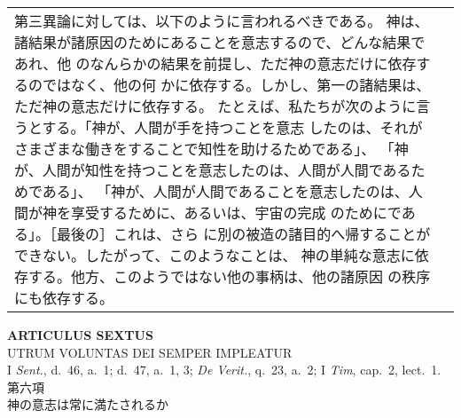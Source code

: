 \documentclass[10pt]{jsarticle} %
\begin{document}
\begin{longtable}{p{21em}p{21em}}
第三異論に対しては、以下のように言われるべきである。
神は、諸結果が諸原因のためにあることを意志するので、どんな結果であれ、他
 のなんらかの結果を前提し、ただ神の意志だけに依存するのではなく、他の何
 かに依存する。しかし、第一の諸結果は、ただ神の意志だけに依存する。
たとえば、私たちが次のように言うとする。「神が、人間が手を持つことを意志
 したのは、それがさまざまな働きをすることで知性を助けるためである」、
 「神が、人間が知性を持つことを意志したのは、人間が人間であるためである」、
 「神が、人間が人間であることを意志したのは、人間が神を享受するために、あるいは、宇宙の完成
 のためにである」。［最後の］これは、さら
 に別の被造の諸目的へ帰することができない。したがって、このようなことは、
 神の単純な意志に依存する。他方、このようではない他の事柄は、他の諸原因
 の秩序にも依存する。


\end{longtable}
\newpage


\begin{center}
 {\Large {\bf ARTICULUS SEXTUS}}\\
 {\large UTRUM VOLUNTAS DEI SEMPER IMPLEATUR}\\
 {\footnotesize I {\itshape Sent.}, d.~46, a.~1; d.~47, a.~1, 3;
 {\itshape De Verit.}, q.~23, a.~2; I {\itshape Tim}, cap.~2, lect.~1.}\\
 {\Large 第六項\\神の意志は常に満たされるか}
\end{center}
\end{document}
